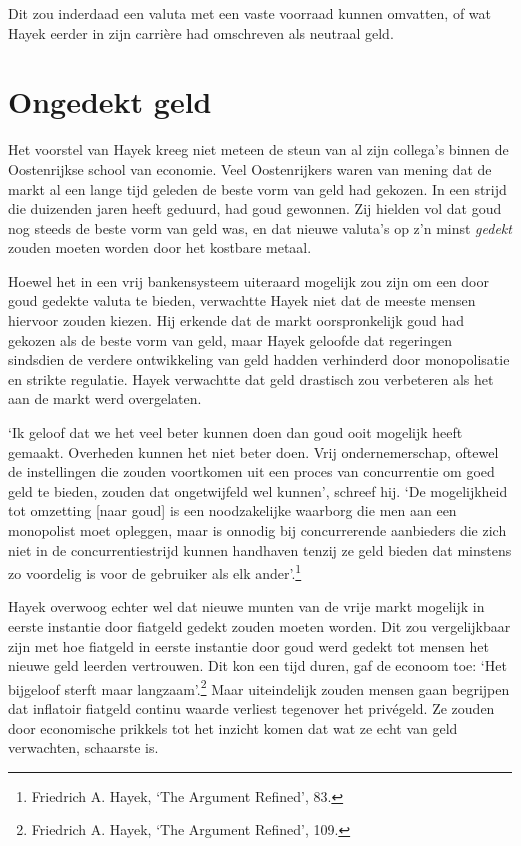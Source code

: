 \documentclass[
  a5paper,
  smalldemyvopaper,11pt,twoside,onecolumn,openright,extrafontsizes]{memoir}
\begin{document}
Dit zou inderdaad een valuta met een vaste voorraad kunnen omvatten, of
wat Hayek eerder in zijn carrière had omschreven als neutraal geld.

\section{Ongedekt geld}\label{ongedekt-geld}

Het voorstel van Hayek kreeg niet meteen de steun van al zijn collega's
binnen de Oostenrijkse school van economie. Veel Oostenrijkers waren van
mening dat de markt al een lange tijd geleden de beste vorm van geld had
gekozen. In een strijd die duizenden jaren heeft geduurd, had goud
gewonnen. Zij hielden vol dat goud nog steeds de beste vorm van geld
was, en dat nieuwe valuta's op z'n minst \emph{gedekt} zouden moeten
worden door het kostbare metaal.

Hoewel het in een vrij bankensysteem uiteraard mogelijk zou zijn om een
door goud gedekte valuta te bieden, verwachtte Hayek niet dat de meeste
mensen hiervoor zouden kiezen. Hij erkende dat de markt oorspronkelijk
goud had gekozen als de beste vorm van geld, maar Hayek geloofde dat
regeringen sindsdien de verdere ontwikkeling van geld hadden verhinderd
door monopolisatie en strikte regulatie. Hayek verwachtte dat geld
drastisch zou verbeteren als het aan de markt werd overgelaten.

`Ik geloof dat we het veel beter kunnen doen dan goud ooit mogelijk
heeft gemaakt. Overheden kunnen het niet beter doen. Vrij
ondernemerschap, oftewel de instellingen die zouden voortkomen uit een
proces van concurrentie om goed geld te bieden, zouden dat ongetwijfeld
wel kunnen', schreef hij. `De mogelijkheid tot omzetting {[}naar goud{]}
is een noodzakelijke waarborg die men aan een monopolist moet opleggen,
maar is onnodig bij concurrerende aanbieders die zich niet in de
concurrentiestrijd kunnen handhaven tenzij ze geld bieden dat minstens
zo voordelig is voor de gebruiker als elk ander'.\footnote{Friedrich A.
  Hayek, `The Argument Refined', 83.}

Hayek overwoog echter wel dat nieuwe munten van de vrije markt mogelijk
in eerste instantie door fiatgeld gedekt zouden moeten worden. Dit zou
vergelijkbaar zijn met hoe fiatgeld in eerste instantie door goud werd
gedekt tot mensen het nieuwe geld leerden vertrouwen. Dit kon een tijd
duren, gaf de econoom toe: `Het bijgeloof sterft maar
langzaam'.\footnote{Friedrich A. Hayek, `The Argument Refined', 109.}
Maar uiteindelijk zouden mensen gaan begrijpen dat inflatoir fiatgeld
continu waarde verliest tegenover het privégeld. Ze zouden door
economische prikkels tot het inzicht komen dat wat ze echt van geld
verwachten, schaarste is.
\end{document}
